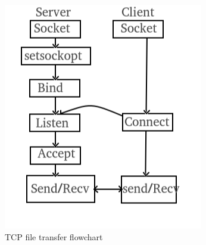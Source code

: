 \documentclass{article}
\begin{document}
\begin{figure}
    \centering
    \includegraphics[width=1\linewidth]{Socket_server-1-modified.png}
    \caption{TCP file transfer flowchart}
    \label{fig:enter-label}
\end{figure}
\end{document}
